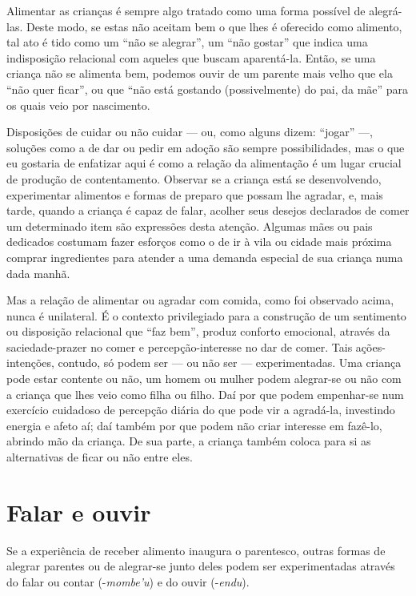 Alimentar as crianças é sempre algo tratado como uma forma possível de
alegrá-las. Deste modo, se estas não aceitam bem o que lhes é oferecido
como alimento, tal ato é tido como um ``não se alegrar'', um ``não gostar'' que
indica uma indisposição relacional com aqueles que buscam aparentá-la.
Então, se uma criança não se alimenta bem, podemos ouvir de um parente
mais velho que ela ``não quer ficar'', ou que ``não está gostando
(possivelmente) do pai, da mãe'' para os quais veio por nascimento.

Disposições de cuidar ou não cuidar --- ou, como alguns dizem: ``jogar'' ---,
soluções como a de dar ou pedir em adoção são sempre possibilidades,
mas o que eu gostaria de enfatizar aqui é como a relação da alimentação
é um lugar crucial de produção de contentamento. Observar se a criança
está se desenvolvendo, experimentar alimentos e formas de preparo que
possam lhe agradar, e, mais tarde, quando a criança é capaz de falar,
acolher seus desejos declarados de comer um determinado item são
expressões desta atenção. Algumas mães ou pais dedicados costumam fazer
esforços como o de ir à vila ou cidade mais próxima comprar
ingredientes para atender a uma demanda especial de sua criança numa
dada manhã.

Mas a relação de alimentar ou agradar com comida, como foi observado
acima, nunca é unilateral. É o contexto privilegiado para a construção
de um sentimento ou disposição relacional que ``faz bem'', produz
conforto emocional, através da saciedade-prazer no comer e
percepção-interesse no dar de comer. Tais ações-intenções, contudo, só
podem ser --- ou não ser --- experimentadas. Uma criança pode estar
contente ou não, um homem ou mulher podem alegrar-se ou não com a
criança que lhes veio como filha ou filho. Daí por que podem
empenhar-se num exercício cuidadoso de percepção diária do que pode vir
a agradá-la, investindo energia e afeto aí; daí também por que podem
não criar interesse em fazê-lo, abrindo mão da criança. De sua parte, a
criança também coloca para si as alternativas de ficar ou não entre
eles. 

\section{Falar e ouvir}

Se a experiência de receber alimento inaugura o parentesco, outras
formas de alegrar parentes ou de alegrar-se junto deles podem ser
experimentadas através do falar ou contar (-\emph{mombe’u}) e do ouvir
(-\emph{endu}).

